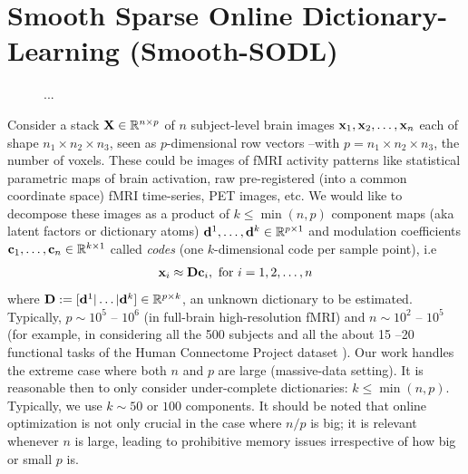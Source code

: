 \section{Smooth Sparse Online Dictionary-Learning (Smooth-SODL)}
\label{sec:contrib}
\begin{figure}
    \centering
    \def\svgwidth{\columnwidth}
    
    \caption{...}
  \end{figure}
  
% 
Consider a stack $\mathbf{X}
\in \mathbb R^{n \times p}$ of $n$ subject-level brain images
$\mathbf{x}_1,\mathbf{x}_2,\ldots,\mathbf{x}_n$ each of shape $n_1 \times n_2 \times n_3$, seen as
$p$-dimensional row vectors --with $p = n_1\times n_2 \times n_3$, the number of voxels. These could be images of fMRI activity
patterns like statistical parametric maps of brain activation, raw
pre-registered (into a common coordinate space) fMRI time-series, PET
images, etc. We would like to decompose these images as a product of
$k \le \min(n, p)$ component maps (aka latent factors or dictionary atoms)
 $\mathbf{d}^1,
\ldots, \mathbf{d}^k \in \mathbb{R}^{p \times 1}$ and modulation coefficients
$\mathbf{c}_1, \ldots, \mathbf{c}_n \in \mathbb R^{k \times 1}$ called \textit{codes} (one $k$-dimensional code per sample point), i.e
\begin{eqnarray}
\mathbf{x}_i \approx \mathbf{D} \mathbf{c}_i, \text{ for } i=1,2,\ldots,n
\end{eqnarray}
where $\mathbf{D} := [\mathbf{d}^1|\ldots|\mathbf{d}^k] \in \mathbb{R}^{p \times k}$, an unknown dictionary to be estimated.
Typically, $p \sim 10^{5}$ --
$10^{6}$ (in full-brain high-resolution fMRI) and $n \sim 10^{2}$ --
$10^{5}$ (for example, in considering all the 500 subjects and all
the about 15 --20 functional tasks of the Human Connectome Project dataset   \citep{VanEssen20122222}). Our work handles the extreme
case where both $n$ and $p$ are large (massive-data setting). 
%
It is reasonable then to only consider under-complete dictionaries: $k
\le \min(n, p)$. Typically, we use $k \sim 50$ or $100$ components.
%
It should be noted that online optimization is not only crucial in the
case where $n / p$ is big; it is relevant whenever $n$ is large,
leading to prohibitive memory issues irrespective of how big or small
$p$ is.

